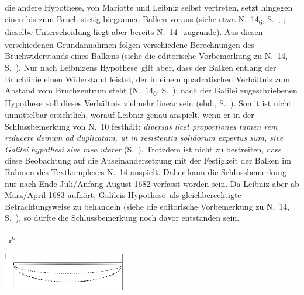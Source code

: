 \begin{ledgroup}
die andere \glqq Hypothese\grqq, von Mariotte und Leibniz selbst vertreten, setzt hingegen einen bis zum Bruch stetig biegsamen Balken voraus (siehe etwa N.~14\textsubscript{6}, S.~; ; dieselbe Unterscheidung liegt aber bereits N.~14\textsubscript{1} zugrunde).
Aus diesen verschiedenen Grundannahmen folgen verschiedene Berechnungen des Bruchwiderstands eines Balkens (siehe die editorische Vorbemerkung zu N.~14, S.~).
Nur nach Leibnizens \glqq Hypothese\grqq\ gilt aber, dass der Balken entlang der Bruchlinie einen Widerstand leistet, der in einem quadratischen Verhältnis zum Abstand vom Bruchzentrum steht (N.~14\textsubscript{6}, S.~);
nach der Galilei zugeschriebenen \glqq Hypothese\grqq\ soll dieses Verhältnis vielmehr linear sein (ebd., S.~).
Somit ist nicht unmittelbar ersichtlich, worauf Leibniz genau anspielt, wenn er in der Schlussbemerkung von N.~10 festhält: \textit{diversas licet proportiones tamen rem reducere demum ad duplicatam, ut in resistentia solidorum expertus sum, sive Galilei\protect{} hypothesi sive mea uterer} (S.~).
Trotzdem ist nicht zu bestreiten, dass diese Beobachtung auf die Auseinandersetzung mit der Festigkeit der Balken im Rahmen des Textkomplexes N.~14 anspielt.
Daher kann die Schlussbemerkung nur nach Ende Juli/Anfang August 1682 verfasst worden sein.
Da Leibniz aber ab März/April 1683 aufhört, Galileis \glqq Hypothese\grqq\ als gleichberechtigte Betrachtungsweise zu behandeln (siehe die editorische Vorbemerkung zu N.~14, S.~), so dürfte die Schlussbemerkung noch davor entstanden sein.%
\pend
\end{ledgroup}
%
%
 \newpage%
\pstart%
\normalsize%
\noindent%
%
~r\textsuperscript{o}\rbrack\ %
%
\pend%
%
  \vspace{1.0em}%
  \centerline{\hspace*{-4mm}\includegraphics[width=0.40\textwidth]{gesamttex/edit_VIII,3/images/LH_35_09_15_021_d1.pdf}}%
